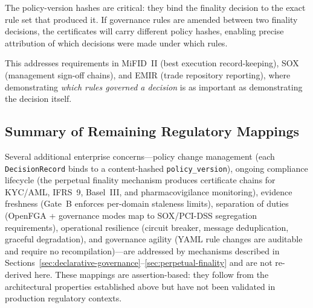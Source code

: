 \documentclass[11pt]{article}
\begin{document}
The policy-version hashes are critical: they bind the finality decision to the exact rule set that produced it. If governance rules are amended between two finality decisions, the certificates will carry different policy hashes, enabling precise attribution of which decisions were made under which rules.

This addresses requirements in MiFID~II (best execution record-keeping), SOX (management sign-off chains), and EMIR (trade repository reporting), where demonstrating \emph{which rules governed a decision} is as important as demonstrating the decision itself.

\subsection{Summary of Remaining Regulatory Mappings}

Several additional enterprise concerns---policy change management (each \texttt{DecisionRecord} binds to a content-hashed \texttt{policy\_version}), ongoing compliance lifecycle (the perpetual finality mechanism produces certificate chains for KYC/AML, IFRS~9, Basel~III, and pharmacovigilance monitoring), evidence freshness (Gate~B enforces per-domain staleness limits), separation of duties (OpenFGA + governance modes map to SOX/PCI-DSS segregation requirements), operational resilience (circuit breaker, message deduplication, graceful degradation), and governance agility (YAML rule changes are auditable and require no recompilation)---are addressed by mechanisms described in Sections~\ref{sec:declarative-governance}--\ref{sec:perpetual-finality} and are not re-derived here. These mappings are assertion-based: they follow from the architectural properties established above but have not been validated in production regulatory contexts.
\end{document}
